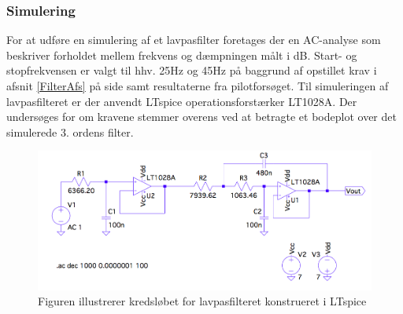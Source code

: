 \subsubsection{Simulering}
For at udføre en simulering af et lavpasfilter foretages der en AC-analyse som beskriver forholdet mellem frekvens og dæmpningen målt i dB. Start- og stopfrekvensen er valgt til hhv. 25Hz og 45Hz på baggrund af opstillet krav i afsnit \ref{FilterAfs} på side \pageref{FilterAfs} samt resultaterne fra pilotforsøget. Til simuleringen af lavpasfilteret er der anvendt LTspice operationsforstærker LT1028A. Der undersøges for om kravene stemmer overens ved at betragte et bodeplot over det simulerede 3. ordens filter.

\begin{figure}[H]
	\centering
	\includegraphics[scale=0.4]{figures/cProblemloesning/Lavpasfilter_LTspice.PNG}
	\caption{Figuren illustrerer kredsløbet for lavpasfilteret konstrueret i LTspice}
	\label{fig:lavpasfilter_LTspice}
\end{figure}


